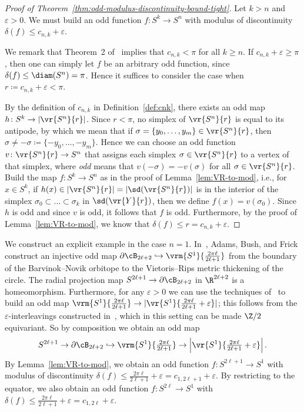 \documentclass[11pt, reqno, english]{amsart}
\begin{document}
\begin{proof}[Proof of Theorem~\ref{thm:odd-modulus-discontinuity-bound-tight}]
Let $k>n$ and $\varepsilon>0$.
We must build an odd function $f\colon S^k \to S^n$ with modulus of discontinuity $\delta(f)\le c_{n,k}+\varepsilon$.

We remark that Theorem~2 of~\cite{ABF2} implies that $c_{n,k}<\pi$ for all $k\ge n$.
If $c_{n,k}+\varepsilon\ge \pi$, then one can simply let $f$ be an arbitrary odd function, since $\delta(f)\le\diam(S^n)=\pi$.
Hence it suffices to consider the case when $r\coloneqq c_{n,k}+\varepsilon<\pi$.

By the definition of $c_{n,k}$ in Definition~\ref{def:cnk}, there exists an odd map $h\colon S^k \to |\vr{S^n}{r}|$.
Since $r<\pi$, no simplex of $\vr{S^n}{r}$ is equal to its antipode, by which we mean that if $\sigma=\{y_0,\ldots,y_m\}\in\vr{S^n}{r}$, then $\sigma\neq-\sigma\coloneqq\{-y_0,\ldots,-y_m\}$.
Hence we can choose an odd function $v\colon \vr{S^n}{r}\to S^n$ that assigns each simplex $\sigma\in \vr{S^n}{r}$ to a vertex of that simplex, where \emph{odd} means that $v(-\sigma)=-v(\sigma)$ for all $\sigma\in\vr{S^n}{r}$.
Build the map $f\colon S^k\to S^n$ as in the proof of Lemma~\ref{lem:VR-to-mod}, i.e., for $x\in S^k$, if $h(x)\in |\vr{S^n}{r}|=|\sd(\vr{S^n}{r})|$ is in the interior of the simplex $\sigma_0 \subset \ldots \subset \sigma_k$ in $\sd(\vr{Y}{r})$, then we define $f(x)=v(\sigma_0)$.
Since $h$ is odd and since $v$ is odd, it follows that $f$ is odd.
Furthermore, by the proof of Lemma~\ref{lem:VR-to-mod}, we know that $\delta(f)\le r=c_{n,k}+\varepsilon$.
\end{proof}

\begin{example}
We construct an explicit example in the case $n=1$.
In~\cite[Section~5]{ABF}, Adams, Bush, and Frick construct an injective odd map $\partial\cB_{2\ell+2}\hookrightarrow\vrm{S^1}{\frac{2\pi \ell}{2\ell+1}}$ from the boundary of the Barvinok--Novik orbitope to the Vietoris--Rips metric thickening of the circle.
The radial projection map $S^{2\ell+1}\to\partial\cB_{2\ell+2}$ in $\R^{2\ell+2}$ is a homeomorphism.
Furthermore, for any $\varepsilon>0$ we can use the techniques of~\cite{AMMW,MoyMasters} to build an odd map $\vrm{S^1}{\frac{2\pi \ell}{2\ell+1}}\to|\vr{S^1}{\frac{2\pi \ell}{2\ell+1}+\varepsilon}|$; this follows from the $\varepsilon$-interleavings constructed in~\cite{AMMW,MoyMasters}, which in this setting can be made $\Z/2$ equivariant.
So by composition we obtain an odd map 
\[S^{2\ell+1}\to\partial\cB_{2\ell+2}\hookrightarrow\vrm{S^1}{\tfrac{2\pi \ell}{2\ell+1}}\to\left\vert\vr{S^1}{\tfrac{2\pi \ell}{2\ell+1}+\varepsilon}\right\vert.\]
By Lemma~\ref{lem:VR-to-mod}, we obtain an odd function $f\colon S^{2\ell+1} \to S^1$ with modulus of discontinuity $\delta(f)\le \frac{2\pi \ell}{2\ell+1}+\varepsilon=c_{1,2\ell+1}+\varepsilon$.
By restricting to the equator, we also obtain an odd function $f\colon S^{2\ell} \to S^1$ with $\delta(f)\le \frac{2\pi \ell}{2\ell+1}+\varepsilon=c_{1,2\ell}+\varepsilon$.
\end{example}
\end{document}
